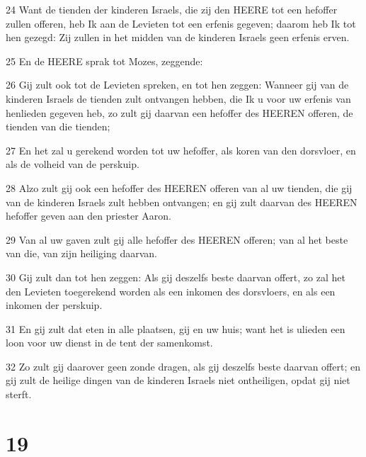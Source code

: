 \par 24 Want de tienden der kinderen Israels, die zij den HEERE tot een hefoffer zullen offeren, heb Ik aan de Levieten tot een erfenis gegeven; daarom heb Ik tot hen gezegd: Zij zullen in het midden van de kinderen Israels geen erfenis erven.
\par 25 En de HEERE sprak tot Mozes, zeggende:
\par 26 Gij zult ook tot de Levieten spreken, en tot hen zeggen: Wanneer gij van de kinderen Israels de tienden zult ontvangen hebben, die Ik u voor uw erfenis van henlieden gegeven heb, zo zult gij daarvan een hefoffer des HEEREN offeren, de tienden van die tienden;
\par 27 En het zal u gerekend worden tot uw hefoffer, als koren van den dorsvloer, en als de volheid van de perskuip.
\par 28 Alzo zult gij ook een hefoffer des HEEREN offeren van al uw tienden, die gij van de kinderen Israels zult hebben ontvangen; en gij zult daarvan des HEEREN hefoffer geven aan den priester Aaron.
\par 29 Van al uw gaven zult gij alle hefoffer des HEEREN offeren; van al het beste van die, van zijn heiliging daarvan.
\par 30 Gij zult dan tot hen zeggen: Als gij deszelfs beste daarvan offert, zo zal het den Levieten toegerekend worden als een inkomen des dorsvloers, en als een inkomen der perskuip.
\par 31 En gij zult dat eten in alle plaatsen, gij en uw huis; want het is ulieden een loon voor uw dienst in de tent der samenkomst.
\par 32 Zo zult gij daarover geen zonde dragen, als gij deszelfs beste daarvan offert; en gij zult de heilige dingen van de kinderen Israels niet ontheiligen, opdat gij niet sterft.

\chapter{19}

